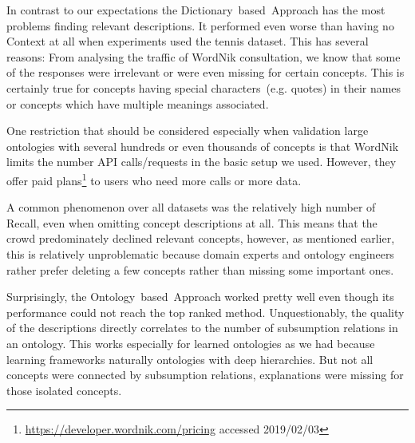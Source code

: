 In contrast to our expectations the Dictionary~based~Approach has the most problems finding relevant descriptions. It performed even worse than having no Context at all when experiments used the tennis dataset. This has several reasons: From analysing the traffic of WordNik consultation, we know that some of the responses were irrelevant or were even missing for certain concepts. This is certainly true for concepts having special characters~(e.g. quotes) in their names or concepts which have multiple meanings associated. 

One restriction that should be considered especially when validation large ontologies with several hundreds or even thousands of concepts is that WordNik limits the number API calls/requests in the basic setup we used. However, they offer paid plans\footnote{\url{https://developer.wordnik.com/pricing} accessed 2019/02/03} to users who need more calls or more data.

A common phenomenon over all datasets was the relatively high number of Recall, even when omitting concept descriptions at all. This means that the crowd predominately declined relevant concepts, however, as mentioned earlier, this is relatively unproblematic because domain experts and ontology engineers rather prefer deleting a few concepts rather than missing some important ones. 

Surprisingly, the Ontology~based~Approach worked pretty well even though its performance could not reach the top ranked method. Unquestionably,
the quality of the descriptions directly correlates to the number of subsumption relations in an ontology. This works especially for learned ontologies as we had because learning frameworks naturally ontologies with deep hierarchies. But not all concepts were connected by subsumption relations, explanations were missing for those isolated concepts. 


